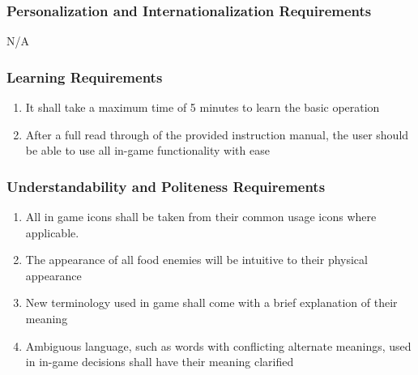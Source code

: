 \documentclass[12pt, titlepage]{article}
\begin{document}
\subsubsection{Personalization and Internationalization Requirements}
\label{ssub:personalization_and_internationalization_requirements}
N/A

\subsubsection{Learning Requirements}
\label{ssub:learning_requirements}
\begin{enumerate}[start=2,label={ UH\arabic*.}]
	\item It shall take a maximum time of 5 minutes to learn the basic operation
	\item After a full read through of the provided instruction manual, the user should be able to use all in-game functionality with ease
\end{enumerate}

\subsubsection{Understandability and Politeness Requirements}
\label{ssub:understandability_and_politeness_requirements}
\begin{enumerate}[start=4,label={ UH\arabic*.}]
	\item All in game icons shall be taken from their common usage icons where applicable.
	\item The appearance of all food enemies will be intuitive to their physical appearance
	\item New terminology used in game shall come with a brief explanation of their meaning
	\item Ambiguous language, such as words with conflicting alternate meanings, used in in-game decisions shall have their meaning clarified
	
\end{enumerate}
\end{document}
